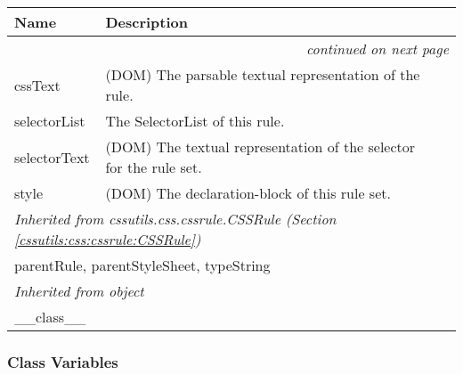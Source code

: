     \vspace{-1cm}
\hspace{\varindent}\begin{longtable}{|p{\varnamewidth}|p{\vardescrwidth}|l}
\cline{1-2}
\cline{1-2} \centering \textbf{Name} & \centering \textbf{Description}& \\
\cline{1-2}
\endhead\cline{1-2}\multicolumn{3}{r}{\small\textit{continued on next page}}\\\endfoot\cline{1-2}
\endlastfoot\raggedright c\-s\-s\-T\-e\-x\-t\- & \raggedright (DOM) The parsable textual representation of the rule.&\\
\cline{1-2}
\raggedright s\-e\-l\-e\-c\-t\-o\-r\-L\-i\-s\-t\- & \raggedright The SelectorList of this rule.&\\
\cline{1-2}
\raggedright s\-e\-l\-e\-c\-t\-o\-r\-T\-e\-x\-t\- & \raggedright (DOM) The textual representation of the selector for the
rule set.&\\
\cline{1-2}
\raggedright s\-t\-y\-l\-e\- & \raggedright (DOM) The declaration-block of this rule set.&\\
\cline{1-2}
\multicolumn{2}{|l|}{\textit{Inherited from cssutils.css.cssrule.CSSRule \textit{(Section \ref{cssutils:css:cssrule:CSSRule})}}}\\
\multicolumn{2}{|p{\varwidth}|}{\raggedright parentRule, parentStyleSheet, typeString}\\
\cline{1-2}
\multicolumn{2}{|l|}{\textit{Inherited from object}}\\
\multicolumn{2}{|p{\varwidth}|}{\raggedright \_\_class\_\_}\\
\cline{1-2}
\end{longtable}



  \subsubsection{Class Variables}

